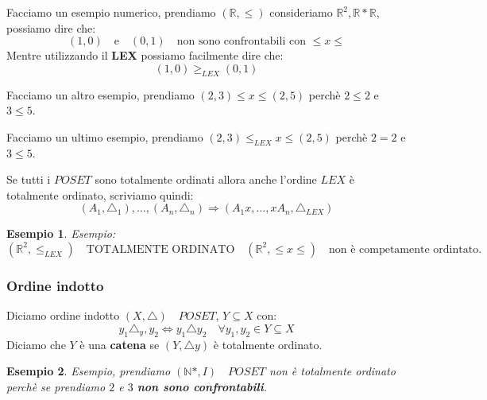 \documentclass{article}
\newtheorem{exmp}{Esempio}[section]
\theoremstyle{definition}
\begin{document}
Facciamo un esempio numerico, prendiamo $(\mathbb{R}, \le)$ consideriamo $\mathbb{R}^2, \mathbb{R}*\mathbb{R}$, possiamo dire che:
\begin{equation*}
        (1, 0) \quad \mbox{e} \quad (0,1) \quad \mbox{non sono confrontabili con $\le x \le$}
\end{equation*}
Mentre utilizzando il \textbf{LEX} possiamo facilmente dire che:
\begin{equation*}
        (1, 0) \ge_{LEX} (0,1)
\end{equation*}

Facciamo un altro esempio, prendiamo $(2,3) \le x \le(2,5)$ perchè $2 \le 2$ e $3 \le 5$. \par
Facciamo un ultimo esempio, prendiamo $(2,3) \le_{LEX} x \le(2,5)$ perchè $2 = 2$ e $3 \le 5$. \newline

Se tutti i $POSET$ sono totalmente ordinati allora anche l'ordine $LEX$ è totalmente ordinato, scriviamo quindi:
\begin{equation*}
        (A_1,\triangle_1), \ldots, (A_n, \triangle_n) \Rightarrow (A_1x,\ldots,xA_n,\triangle_{LEX})
\end{equation*}

\begin{exmp}
Esempio:
\begin{equation*}
        (\mathbb{R}^2, \le_{LEX}) \quad \mbox{TOTALMENTE ORDINATO} \quad (\mathbb{R}^2, \le x \le) \quad \mbox{non è competamente ordintato}. 
\end{equation*}
\end{exmp}



\subsubsection{Ordine indotto}\label{sec:ordine_indotto}
Diciamo ordine indotto $(X, \triangle) \quad POSET$, $ Y \subseteq X$ con:
\begin{equation*}
        y_1 \triangle_y,y_2 \Leftrightarrow y_1 \triangle y_2 \quad \forall y_1,y_2 \in Y \subseteq X
\end{equation*}
Diciamo che $Y$ è una \textbf{catena} se $(Y, \triangle y)$ è totalmente ordinato. \par

\begin{exmp}
        
Esempio, prendiamo $(\mathbb{N}*, I) \quad POSET$ non è totalmente ordinato perchè se prendiamo $2$ e $3$ \textbf{non sono confrontabili}. \par
{}
\end{exmp}
\end{document}
